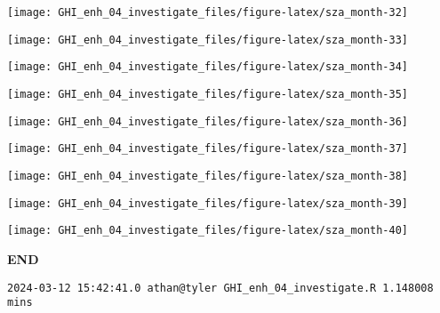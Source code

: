 \documentclass[
  10pt,
  a4paper,oneside]{article}
\begin{document}
\begin{center}\texttt{[image: GHI\_enh\_04\_investigate\_files/figure-latex/sza\_month-32]} \end{center}

\begin{center}\texttt{[image: GHI\_enh\_04\_investigate\_files/figure-latex/sza\_month-33]} \end{center}

\begin{center}\texttt{[image: GHI\_enh\_04\_investigate\_files/figure-latex/sza\_month-34]} \end{center}

\begin{center}\texttt{[image: GHI\_enh\_04\_investigate\_files/figure-latex/sza\_month-35]} \end{center}

\begin{center}\texttt{[image: GHI\_enh\_04\_investigate\_files/figure-latex/sza\_month-36]} \end{center}

\begin{center}\texttt{[image: GHI\_enh\_04\_investigate\_files/figure-latex/sza\_month-37]} \end{center}

\begin{center}\texttt{[image: GHI\_enh\_04\_investigate\_files/figure-latex/sza\_month-38]} \end{center}

\begin{center}\texttt{[image: GHI\_enh\_04\_investigate\_files/figure-latex/sza\_month-39]} \end{center}

\begin{center}\texttt{[image: GHI\_enh\_04\_investigate\_files/figure-latex/sza\_month-40]} \end{center}

\textbf{END}

\begin{verbatim}
2024-03-12 15:42:41.0 athan@tyler GHI_enh_04_investigate.R 1.148008 mins
\end{verbatim}
\end{document}
